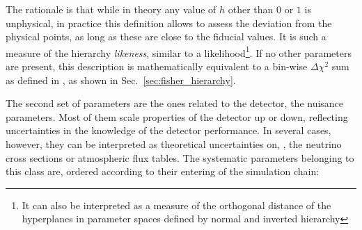 The rationale is that while in theory any value of $h$ other than $0$ or $1$ is
unphysical, in practice this definition allows to assess the deviation from the
physical points, as long as these are close to the fiducial values. It is such 
a measure of the hierarchy \textit{likeness}, similar to a
likelihood\footnote{It can also be interpreted as a measure of the orthogonal
distance of the hyperplanes in parameter spaces defined by normal and inverted
hierarchy}.
If no other parameters are present, this description is mathematically
equivalent to a bin-wise $\Delta\chi^2$ sum as defined in \cite{Akhmedov}, as 
shown in Sec.~\ref{sec:fisher_hierarchy}.

The second set of parameters are the ones related to the detector, \ie the
nuisance parameters. Most of them scale properties of the detector up or down, 
reflecting uncertainties in the knowledge of the detector performance. In 
several cases, however, they can be interpreted as theoretical uncertainties 
on, \eg, the neutrino cross sections or atmospheric flux tables. The systematic 
parameters belonging to this class are, ordered according to their entering of 
the simulation chain:

